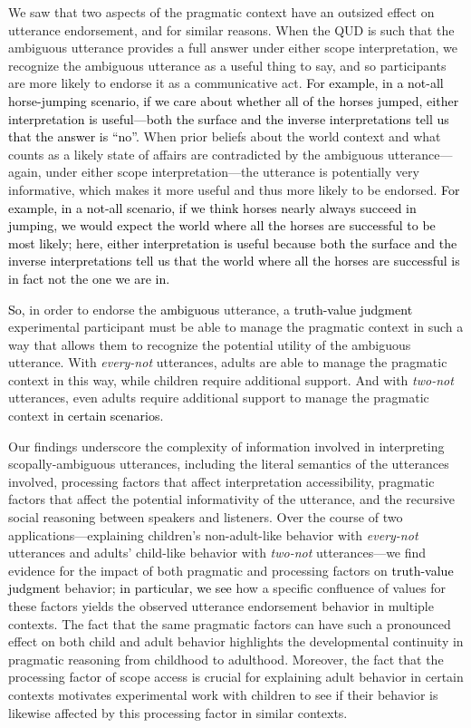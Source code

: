 \documentclass[cm]{glossa}
\newcommand{\lp}[1]{\textcolor{black}{#1}} %
\begin{document}
We saw that two aspects of the pragmatic context have an outsized effect on utterance endorsement, and for similar reasons. When the QUD is such that the ambiguous utterance provides a full answer under either scope interpretation, we recognize the ambiguous utterance as a useful thing to say, and so participants are more likely to endorse it as a communicative act. 
\lp{For example, in a not-all horse-jumping scenario, if we care about whether all of the horses jumped, either interpretation is useful---both the surface %
and the inverse %
interpretations tell us that the answer is ``no''.}
When prior beliefs about the world context and what counts as a likely state of affairs are contradicted by the ambiguous utterance---again, under either scope interpretation---the utterance is potentially very informative, which makes it more useful and thus more likely to be endorsed. 
\lp{For example, in a not-all scenario, if we think horses nearly always succeed in jumping, we would expect the world where all the horses are successful to be most likely; here, either interpretation is useful because both the surface %
and the inverse %
interpretations
tell us that the world where all the horses are successful is in fact not the one we are in.}

\lp{So,} in order to endorse the \lp{ambiguous} utterance, a \lp{truth-value judgment} experimental participant must be able to manage the pragmatic context in such a way that allows them to recognize the potential utility of the ambiguous utterance. With \emph{every-not} utterances, adults are able to manage the pragmatic context in this way, while children require additional support. And with \emph{two-not} utterances, even adults require additional support to manage the pragmatic context \lp{in certain scenarios}.

Our findings underscore the complexity of information involved in interpreting scopally-ambiguous utterances, including the literal semantics of the utterances involved, processing factors that affect interpretation accessibility, pragmatic factors that affect the potential informativity of the utterance, and the recursive social reasoning between speakers and listeners. Over the course of two applications---explaining children's non-adult-like behavior with \emph{every-not} utterances and adults' child-like behavior with \emph{two-not} utterances---we find evidence for the impact of both pragmatic and processing factors on 
\lp{truth-value judgment}
behavior; \lp{in particular,} \lp{we see} how a specific confluence of values for these factors yields the observed utterance endorsement behavior in multiple contexts. The fact that the same pragmatic factors can have such a pronounced effect on both child and adult behavior highlights the developmental continuity in pragmatic reasoning from childhood to adulthood. Moreover, the fact that the processing factor of scope access is crucial for explaining adult behavior in certain contexts motivates experimental work with children to see if their behavior is likewise affected by this processing factor in similar contexts. 
\end{document}
